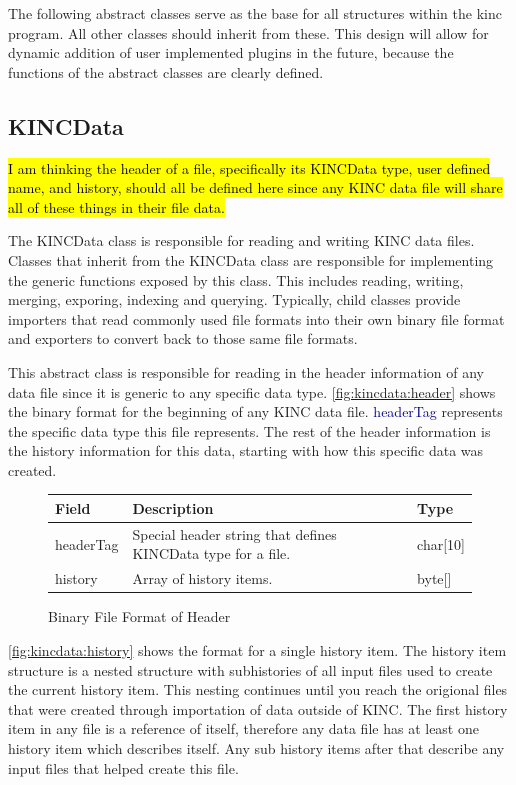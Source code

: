 \documentclass[10pt]{article}
\providecommand{\josh}[1]{\sethlcolor{lblue}\hl{#1}}
\providecommand{\h}[1]{\textcolor{darkblue}{#1}}
\begin{document}
The following abstract classes serve as the base for all structures within the 
kinc program.  All other classes should inherit from these. This design will 
allow for dynamic addition of user implemented plugins in the future, because
the functions of the abstract classes are clearly defined.

\subsection{KINCData}

\josh{I am thinking the header of a file, specifically its KINCData type, user 
defined name, and history, should all be defined here since any KINC data file 
will share all of these things in their file data.}

The KINCData class is responsible for reading and writing KINC data files.  
Classes that inherit from the KINCData class are responsible for implementing 
the generic functions exposed by this class.  This includes reading, writing, 
merging, exporing, indexing and querying. Typically, child classes provide 
importers that read commonly used file formats into their own binary file 
format and exporters to convert back to those same file formats.

This abstract class is responsible for reading in the header information of any 
data file since it is generic to any specific data type. 
\autoref{fig:kincdata:header} shows the binary format for the beginning of any 
KINC data file. \h{headerTag} represents the specific data type this file 
represents. The rest of the header information is the history information for 
this data, starting with how this specific data was created.

\begin{figure}[H]
\centering
\begin{tabularx}{\textwidth}{|l|X|l|}
\hline
\textbf{Field} & \textbf{Description} & \textbf{Type} \\
\hline
headerTag & Special header string that defines KINCData type for a file. & 
char[10] \\
\hline
history & Array of history items. & byte[] \\
\hline
\end{tabularx}
\caption{Binary File Format of Header}
\label{fig:kincdata:header}
\end{figure}

\autoref{fig:kincdata:history} shows the format for a single history item. The 
history item structure is a nested structure with subhistories of all input 
files used to create the current history item. This nesting continues until you 
reach the origional files that were created through importation of data outside 
of KINC. The first history item in any file is a reference of itself, therefore 
any data file has at least one history item which describes itself. Any sub 
history items after that describe any input files that helped create this file.
\end{document}
